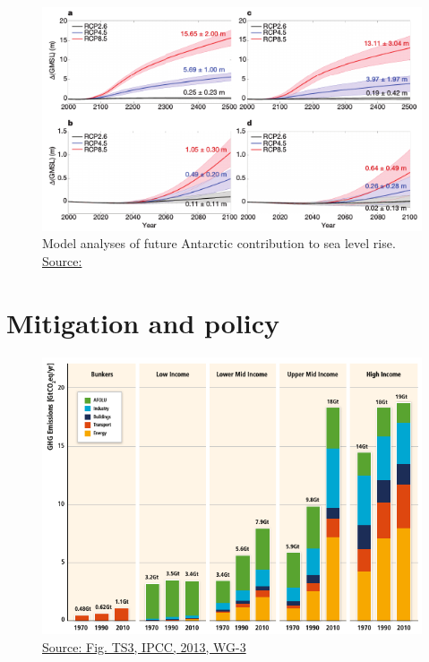 \documentclass{beamer}
\begin{document}
\begin{frame}
\begin{figure}
\includegraphics[width=\linewidth]{./Images/Deconto_2016_SLR.png}
\caption{\label{fig:DeContoSLR} Model analyses of future Antarctic contribution to sea level rise. \href{https://www.nature.com/articles/nature17145}{\tiny Source: \citep{deconto2016AntSLR} }}
\end{figure}
\end{frame}



\section{Mitigation and policy}

\begin{frame}
\begin{figure}
\includegraphics[width=\linewidth]{./Images/Emissions_byIncome.png}
\caption{\label{fig:EmissionsIncome} \href{http://www.ipcc.ch/pdf/assessment-report/ar5/wg3/ipcc_wg3_ar5_full.pdf}{\tiny Source: Fig. TS3, IPCC, 2013, WG-3 }}
\end{figure}
\end{frame}
\end{document}
